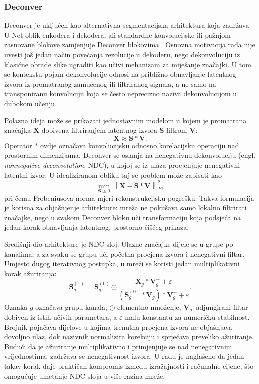 \documentclass[a4paper,12pt,oneside]{article}
\begin{document}
\subsubsection{Deconver}

Deconver je uključen kao alternativna segmentacijska arhitektura koja zadržava U-Net oblik enkodera i dekodera, ali standardne konvolucijske ili pažnjom zasnovane blokove zamjenjuje Deconver blokovima \cite{deconver}. Osnovna motivacija rada nije uvesti još jedan način povećanja rezolucije u dekoderu, nego dekonvoluciju iz klasične obrade slike ugraditi kao učivi mehanizam za miješanje značajki. U tom se kontekstu pojam dekonvolucije odnosi na približno obnavljanje latentnog izvora iz promatranog zamućenog ili filtriranog signala, a ne samo na transponiranu konvoluciju koja se često neprecizno naziva dekonvolucijom u dubokom učenju.

Polazna ideja može se prikazati jednostavnim modelom u kojem je promatrana značajka $\mathbf{X}$ dobivena filtriranjem latentnog izvora $\mathbf{S}$ filtrom $\mathbf{V}$:
\begin{equation}\label{eq:deconver_forward}
\mathbf{X} \approx \mathbf{S} * \mathbf{V}.
\end{equation}
Operator $*$ ovdje označava konvolucijsku odnosno korelacijsku operaciju nad prostornim dimenzijama. Deconver se oslanja na nenegativnu dekonvoluciju (engl. \textit{nonnegative deconvolution}, NDC), u kojoj se iz ulaza procjenjuje nenegativni latentni izvor. U idealiziranom obliku taj se problem može zapisati kao
\begin{equation}\label{eq:deconver_objective}
\min_{\mathbf{S} \ge 0} \left\lVert \mathbf{X} - \mathbf{S} * \mathbf{V} \right\rVert_F^2,
\end{equation}
pri čemu Frobeniusova norma mjeri rekonstrukcijsku pogrešku. Takva formulacija je korisna za objašnjenje arhitekture: mreža ne pokušava samo lokalno filtrirati značajke, nego u svakom Deconver bloku uči transformaciju koja podsjeća na jedan korak obnavljanja latentnog, prostorno čišćeg prikaza.

Središnji dio arhitekture je NDC sloj. Ulazne značajke dijele se u grupe po kanalima, a za svaku se grupu uči početna procjena izvora i nenegativni filtar. Umjesto dugog iterativnog postupka, u mreži se koristi jedan multiplikativni korak ažuriranja:
\begin{equation}\label{eq:deconver_ndc_update}
\mathbf{S}_g^{(1)} =
\mathbf{S}_g^{(0)} \odot
\frac{\mathbf{X}_g * \mathbf{V}_g^{-} + \varepsilon}
{(\mathbf{S}_g^{(0)} * \mathbf{V}_g) * \mathbf{V}_g^{-} + \varepsilon}.
\end{equation}
Oznaka $g$ označava grupu kanala, $\odot$ elementno množenje, $\mathbf{V}_g^{-}$ adjungirani filtar dobiven iz istih učivih parametara, a $\varepsilon$ malu konstantu za numeričku stabilnost. Brojnik pojačava dijelove u kojima trenutna procjena izvora ne objašnjava dovoljno ulaz, dok nazivnik normalizira korekciju i sprječava preveliko ažuriranje. Budući da je ažuriranje multiplikativno i primjenjuje se nad nenegativnim vrijednostima, zadržava se nenegativnost izvora. U radu je naglašeno da jedan takav korak daje praktičan kompromis između izražajnosti i računalne cijene, što omogućuje umetanje NDC sloja u više razina mreže.
\end{document}

